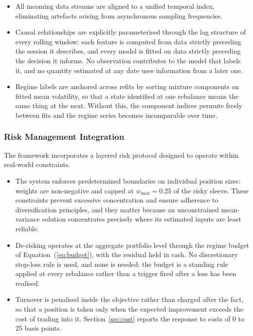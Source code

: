 \documentclass{singlecol-new}
\theoremstyle{TH}{
\newtheorem{lemma}{Lemma}
\newtheorem{theorem}[lemma]{Theorem}
\newtheorem{corrolary}[lemma]{Corrolary}
\newtheorem{conjecture}[lemma]{Conjecture}
\newtheorem{proposition}[lemma]{Proposition}
\newtheorem{claim}[lemma]{Claim}
\newtheorem{stheorem}[lemma]{Wrong Theorem}
\newtheorem{algorithm}{Algorithm}
}
\theoremstyle{THrm}{
\newtheorem{definition}{Definition}[section]
\newtheorem{question}{Question}[section]
\newtheorem{remark}{Remark}
\newtheorem{scheme}{Scheme}
}
\theoremstyle{THhit}{
\newtheorem{case}{Case}[section]
}
\begin{document}
\begin{itemize}
\item All incoming data streams are aligned to a unified temporal index, eliminating
artefacts arising from asynchronous sampling frequencies.
\item Causal relationships are explicitly parameterised through the lag structure of
every rolling window: each feature is computed from data strictly preceding the session
it describes, and every model is fitted on data strictly preceding the decision it
informs. No observation contributes to the model that labels it, and no quantity
estimated at any date uses information from a later one.
\item Regime labels are anchored across refits by sorting mixture components on fitted
mean volatility, so that a state identified at one rebalance means the same thing at the
next. Without this, the component indices permute freely between fits and the regime
series becomes incomparable over time.
\end{itemize}

\subsubsection{Risk Management Integration}

The framework incorporates a layered risk protocol designed to operate within real-world
constraints.

\begin{itemize}
\item The system enforces predetermined boundaries on individual position sizes: weights
are non-negative and capped at $w_{\max} = 0.25$ of the risky sleeve. These constraints
prevent excessive concentration and ensure adherence to diversification principles, and
they matter because an unconstrained mean-variance solution concentrates precisely where
its estimated inputs are least reliable.
\item De-risking operates at the aggregate portfolio level through the regime budget of
Equation~(\ref{eq:budget}), with the residual held in cash. No discretionary stop-loss
rule is used, and none is needed: the budget is a standing rule applied at every
rebalance rather than a trigger fired after a loss has been realised.
\item Turnover is penalised inside the objective rather than charged after the fact, so
that a position is taken only when the expected improvement exceeds the cost of trading
into it. Section~\ref{sec:cost} reports the response to costs of 0 to 25 basis points.
\end{itemize}
\end{document}

